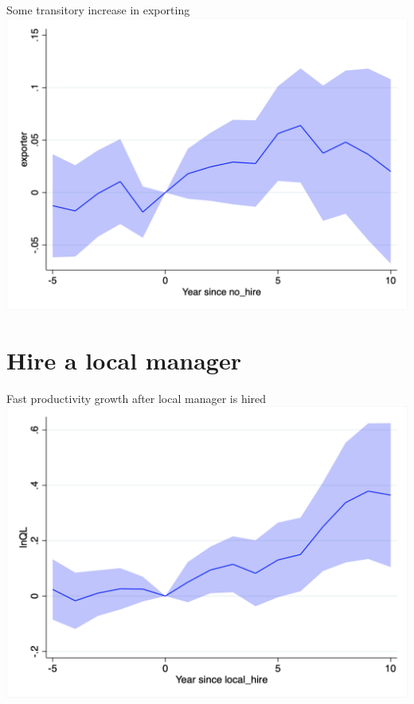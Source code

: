 \documentclass[
  ignorenonframetext,
  aspectratio=43,
]{beamer}
\begin{document}
\begin{frame}{Some transitory increase in exporting}
\protect\hypertarget{some-transitory-increase-in-exporting}{}
\includegraphics{figure/event_study/no_hire_exporter.png}
\end{frame}

\hypertarget{hire-a-local-manager}{%
\section{Hire a local manager}\label{hire-a-local-manager}}

\begin{frame}{Fast productivity growth after local manager is hired}
\protect\hypertarget{fast-productivity-growth-after-local-manager-is-hired}{}
\includegraphics{figure/event_study/local_hire_lnQL.png}
\end{frame}
\end{document}
